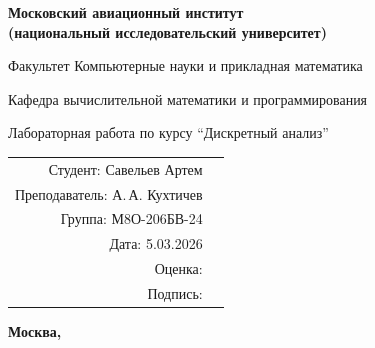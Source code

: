 \begin{titlepage}
\begin{center}
\bfseries
{\Large Московский авиационный институт\\ (национальный исследовательский университет)}

\vspace{48pt}
{\large Факультет Компьютерные науки и прикладная математика}

\vspace{36pt}
{\large Кафедра вычислительной математики и программирования}

\vspace{48pt}
Лабораторная работа  по курсу \enquote{Дискретный анализ}
\end{center}

\vspace{72pt}
\begin{flushright}
\begin{tabular}{rl}
Студент: Савельев Артем \\
Преподаватель: А.\,А. Кухтичев& \\
Группа: М8О-206БВ-24& \\
Дата: 5.03.2026& \\
Оценка: & \\
Подпись: & \\
\end{tabular}
\end{flushright}

\vfill
\begin{center}
\bfseries
Москва, \the\year
\end{center}
\end{titlepage}
\pagebreak